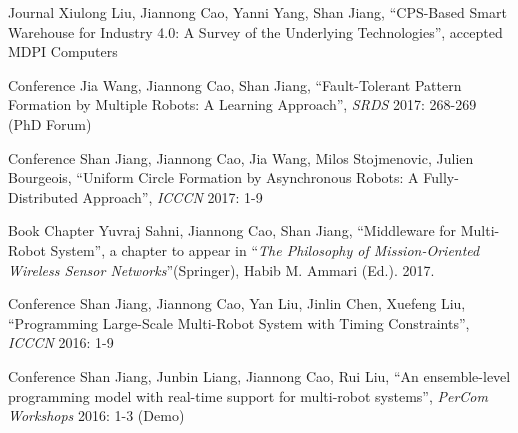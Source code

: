 \documentclass[11pt, a4paper]{awesome-cv} %
\begin{document}
\begin{cvpublications}
\cvpublication
{Journal}
{Xiulong Liu, Jiannong Cao, Yanni Yang, Shan Jiang, ``CPS-Based Smart Warehouse for Industry 4.0: A Survey of the Underlying Technologies'', accepted MDPI Computers} 

\cvpublication
{Conference}
{Jia Wang, Jiannong Cao, Shan Jiang, ``Fault-Tolerant Pattern Formation by Multiple Robots: A Learning Approach'', {\em SRDS} 2017: 268-269 (PhD Forum)}

\cvpublication
{Conference}
{Shan Jiang, Jiannong Cao, Jia Wang, Milos Stojmenovic, Julien Bourgeois, ``Uniform Circle Formation by Asynchronous Robots: A Fully-Distributed Approach'', {\em ICCCN} 2017: 1-9}

\cvpublication
{Book Chapter}
{Yuvraj Sahni, Jiannong Cao, Shan Jiang, ``Middleware for Multi-Robot System'', a chapter to appear in ``{\em The Philosophy of Mission-Oriented Wireless Sensor Networks}''(Springer), Habib M. Ammari (Ed.). 2017.}

\cvpublication
{Conference}
{Shan Jiang, Jiannong Cao, Yan Liu, Jinlin Chen, Xuefeng Liu, ``Programming Large-Scale Multi-Robot System with Timing Constraints'', {\em ICCCN} 2016: 1-9}

\cvpublication
{Conference}
{Shan Jiang, Junbin Liang, Jiannong Cao, Rui Liu, ``An ensemble-level programming model with real-time support for multi-robot systems'', {\em PerCom Workshops} 2016: 1-3 (Demo)}
\end{cvpublications}
\end{document}

